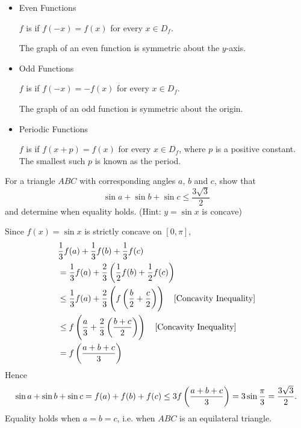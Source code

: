 \begin{itemize}
\item Even Functions

$f$ is  if $f(-x)=f(x)$ for every $x\in D_f$.

The graph of an even function is symmetric about the $y$-axis.

\item Odd Functions

$f$ is  if $f(-x)=-f(x)$ for every $x\in D_f$.

The graph of an odd function is symmetric about the origin.

\item Periodic Functions

$f$ is  if $f(x+p)=f(x)$ for every $x\in D_f$, where $p$ is a positive constant. The smallest such $p$ is known as the period.
\end{itemize}

\begin{exercise}{}{}
For a triangle $ABC$ with corresponding angles $a$, $b$ and $c$, show that
\[ \sin a+\sin b+\sin c\le\frac{3\sqrt{3}}{2} \]
and determine when equality holds. (Hint: $y=\sin x$ is concave)
\end{exercise}

\begin{solution}
Since $f(x)=\sin x$ is strictly concave on $[0,\pi]$,
\begin{align*}
&\frac{1}{3}f(a)+\frac{1}{3}f(b)+\frac{1}{3}f(c) \\
&= \frac{1}{3}f(a)+\frac{2}{3}\left(\frac{1}{2}f(b)+\frac{1}{2}f(c)\right) \\
&\le \frac{1}{3}f(a)+\frac{2}{3}\left(f\left(\frac{b}{2}+\frac{c}{2}\right)\right) \quad \text{[Concavity Inequality]} \\
&\le f\left(\frac{a}{3}+\frac{2}{3}\left(\frac{b+c}{2}\right)\right) \quad \text{[Concavity Inequality]} \\
&= f\left(\frac{a+b+c}{3}\right)
\end{align*}
Hence 
\[ \sin a+\sin b+\sin c=f(a)+f(b)+f(c)\le3f\left(\frac{a+b+c}{3}\right)=3\sin\frac{\pi}{3}=\frac{3\sqrt{3}}{2}. \]
Equality holds when $a=b=c$, i.e. when $ABC$ is an equilateral triangle.
\end{solution}
\pagebreak

